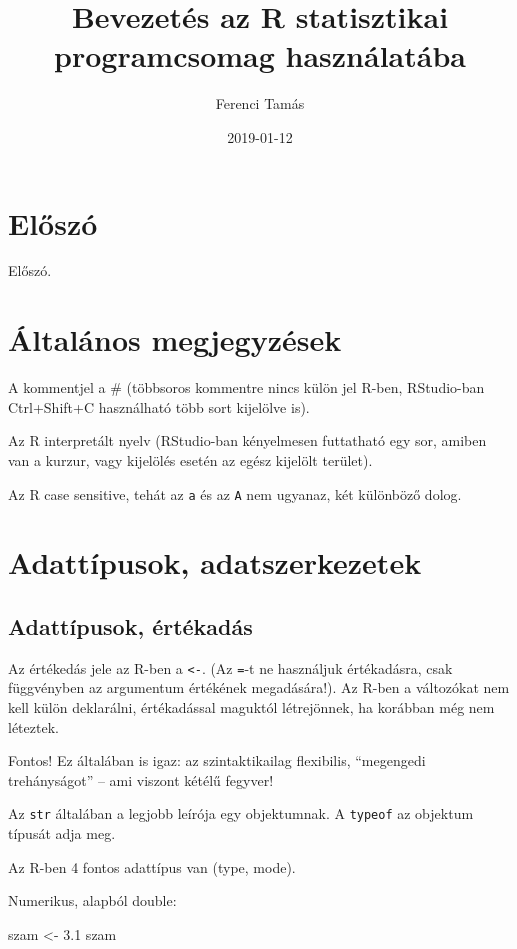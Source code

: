 \documentclass[]{book}
\title{Bevezetés az R statisztikai programcsomag használatába}
\author{Ferenci Tamás}
\date{2019-01-12}
\newenvironment{Shaded}{\begin{snugshade}}{\end{snugshade}}
\newcommand{\FloatTok}[1]{\textcolor[rgb]{0.00,0.00,0.81}{#1}}
\newcommand{\StringTok}[1]{\textcolor[rgb]{0.31,0.60,0.02}{#1}}
\newcommand{\NormalTok}[1]{#1}
\begin{document}
\maketitle

{
\setcounter{tocdepth}{1}
\tableofcontents
}
\chapter{Előszó}\label{eloszo}

Előszó.

\chapter{Általános megjegyzések}\label{altalanos-megjegyzesek}

A kommentjel a \# (többsoros kommentre nincs külön jel R-ben,
RStudio-ban Ctrl+Shift+C használható több sort kijelölve is).

Az R interpretált nyelv (RStudio-ban kényelmesen futtatható egy sor,
amiben van a kurzur, vagy kijelölés esetén az egész kijelölt terület).

Az R case sensitive, tehát az \texttt{a} és az \texttt{A} nem ugyanaz,
két különböző dolog.

\chapter{Adattípusok,
adatszerkezetek}\label{adattipusok-adatszerkezetek}

\section{Adattípusok, értékadás}\label{adattipusok-ertekadas}

Az értékedás jele az R-ben a \texttt{\textless{}-}. (Az \texttt{=}-t ne
használjuk értékadásra, csak függvényben az argumentum értékének
megadására!). Az R-ben a változókat nem kell külön deklarálni,
értékadással maguktól létrejönnek, ha korábban még nem léteztek.

Fontos! Ez általában is igaz: az szintaktikailag flexibilis, ``megengedi
trehányságot'' -- ami viszont kétélű fegyver!

Az \texttt{str} általában a legjobb leírója egy objektumnak. A
\texttt{typeof} az objektum típusát adja meg.

Az R-ben 4 fontos adattípus van (type, mode).

Numerikus, alapból double:

\begin{Shaded}
\begin{Highlighting}[]
\NormalTok{szam <-}\StringTok{ }\FloatTok{3.1}
\NormalTok{szam}
\end{Highlighting}
\end{Shaded}
\end{document}
